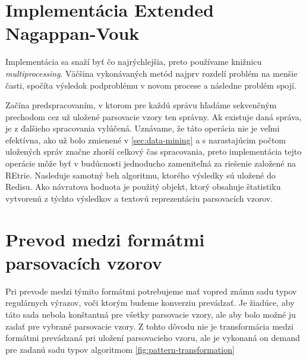 \section{Implementácia Extended Nagappan-Vouk}
Implementácia sa snaží byť čo najrýchlejšia, preto používame knižnicu \emph{multiprocessing}. Väčšina vykonávaných metód najprv rozdelí problém na menšie časti, spočíta výsledok podproblému v novom procese a následne problém spojí. 
\par  Začína predspracovaním, v ktorom pre každú správu hľadáme sekvenčným prechodom cez už uložené parsovacie vzory ten správny. Ak existuje daná správa, je z ďalšieho spracovania vylúčená. Uznávame, že táto operácia nie je veľmi efektívna, ako už bolo zmienené v \ref{sec:data-mining} a s narastajúcim počtom uložených správ značne zhorší celkový čas spracovania, preto implementácia tejto operácie môže byť v budúcnosti  jednoducho zameniteľná za riešenie založené na REtrie. Nasleduje samotný beh algoritmu, ktorého výsledky sú uložené do Redisu. Ako návratova hodnota je použitý objekt, ktorý obsahuje štatistiku vytvorenú z týchto výsledkov a textovú reprezentáciu parsovacích vzorov.

\section{Prevod medzi formátmi parsovacích vzorov}
\label{sec:format-transformation}

Pri prevode medzi týmito formátmi potrebujeme mať vopred známu sadu typov regulárnych výrazov, voči ktorým budeme konverziu prevádzať. Je žiadúce, aby táto sada nebola konštantná pre všetky parsovacie vzory, ale aby bolo možné ju zadať pre vybrané parsovacie vzory. Z tohto dôvodu nie je transformácia medzi formátmi prevádzaná pri uložení parsovacieho vzoru, ale je vykonaná on demand pre zadanú sadu typov algoritmom \ref{fig:pattern-transformation}

